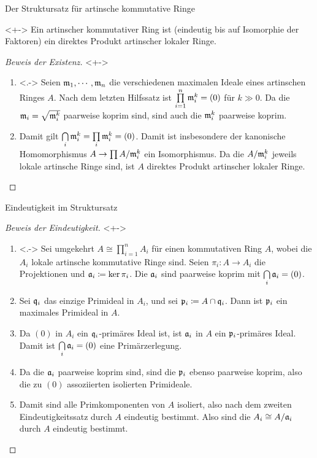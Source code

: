 \begin{frame}{Der Struktursatz für artinsche kommutative Ringe}
	\begin{theorem}<+->
		\label{thm:artin_structure}
		Ein artinscher kommutativer Ring ist (eindeutig bis auf Isomorphie
		der Faktoren) ein direktes Produkt artinscher lokaler
		Ringe.
	\end{theorem}
	\begin{proof}[Beweis der Existenz]<+->
		\renewcommand{\qedsymbol}{}
		\begin{enumerate}[<+->]
		\item<.->
			Seien \(\mathfrak{m}_1, \dotsb, \mathfrak{m}_n\) die verschiedenen maximalen
			Ideale eines artinschen Ringes \(A\). Nach dem letzten Hilfssatz
			ist \(\prod\limits_{i = 1}^n \mathfrak{m}_i^k = (0)\) für \(k \gg 0\).
			Da die \(\mathfrak{m}_i = \sqrt{\mathfrak{m}_i^k}\) paarweise koprim sind,
			sind auch die \(\mathfrak{m}_i^k\) paarweise koprim.
		\item
			Damit gilt \(\bigcap\limits_i \mathfrak{m}_i^k
			= \prod\limits_i \mathfrak{m}_i^k = (0)\). Damit ist insbesondere
			der kanonische Homomorphismus \(A \to \prod\limits A/\mathfrak{m}_i^k\)
			ein Isomorphismus. Da die \(A/\mathfrak{m}_i^k\) jeweils lokale
			artinsche Ringe sind, ist \(A\) direktes Produkt artinscher lokaler
			Ringe.
			\qedhere
		\end{enumerate}
	\end{proof}
\end{frame}

\begin{frame}{Eindeutigkeit im Struktursatz}
	\begin{proof}[Beweis der Eindeutigkeit]<+->
		\begin{enumerate}[<+->]
		\item<.->
			Sei umgekehrt \(A \cong \prod\limits_{i = 1}^n A_i\) für einen
			kommutativen Ring \(A\), wobei die
			\(A_i\) lokale artinsche kommutative Ringe sind. Seien
			\(\pi_i\colon A \to A_i\) die Projektionen und \(\mathfrak{a}_i
			\coloneqq \ker\pi_i\). Die \(\mathfrak{a}_i\) sind paarweise koprim
			mit \(\bigcap\limits_i \mathfrak{a}_i = (0)\).
		\item
			Sei \(\mathfrak{q}_i\) das einzige Primideal in \(A_i\), und sei
			\(\mathfrak{p}_i \coloneqq A \cap \mathfrak{q}_i\). Dann ist \(\mathfrak{p}_i\)
			ein maximales Primideal in \(A\).
		\item
			Da \((0)\) in \(A_i\) ein \(\mathfrak{q}_i\)-primäres Ideal ist, ist \(\mathfrak{a}_i\) in \(A\)
			ein \(\mathfrak{p}_i\)-primäres Ideal. Damit ist \(\bigcap\limits_i
			\mathfrak{a}_i = (0)\) eine Primärzerlegung.
		\item
			Da die \(\mathfrak{a}_i\) paarweise koprim sind, sind die \(\mathfrak{p}_i\)
			ebenso paarweise koprim, also die zu \((0)\)
			assoziierten isolierten Primideale.
		\item
			Damit sind alle Primkomponenten von \(A\) isoliert, also nach
			dem zweiten Eindeutigkeitssatz durch \(A\) eindeutig bestimmt.
			Also sind die \(A_i \cong A/\mathfrak{a}_i\) durch \(A\) eindeutig
			bestimmt.
			\qedhere
		\end{enumerate}
	\end{proof}
\end{frame}

